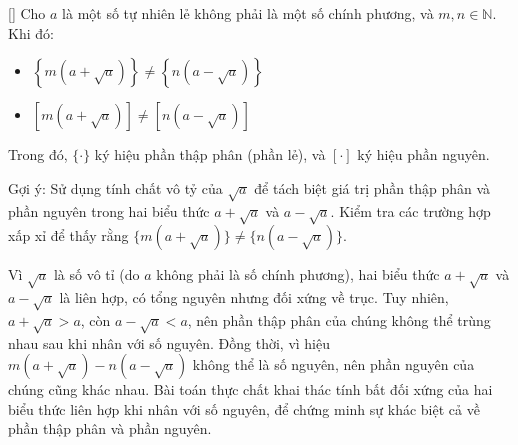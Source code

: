 \documentclass[../02-modular-arithmetic-b.tex]{subfiles}
\begin{document}
\begin{exercise*}\label{example:ROU-2014-MO-G9-P2}[\textbf{}]
    Cho \( a \) là một số tự nhiên lẻ không phải là một số chính phương, và \( m, n \in \mathbb{N} \). Khi đó:

    \begin{itemize}[topsep=0pt, partopsep=0pt, itemsep=0pt]
        \item \( \left\{ m\left( a+\sqrt{a} \right) \right\} \neq \left\{ n\left( a-\sqrt{a} \right) \right\} \)
        \item \( \left[ m\left( a+\sqrt{a} \right) \right] \neq \left[ n\left( a-\sqrt{a} \right) \right] \)
    \end{itemize}

    Trong đó, \( \{\cdot\} \) ký hiệu phần thập phân (phần lẻ), và \( [\cdot] \) ký hiệu phần nguyên.
\end{exercise*}

\begin{remark*}
    Gợi ý: Sử dụng tính chất vô tỷ của \( \sqrt{a} \) để tách biệt giá trị phần thập phân và phần nguyên trong hai biểu thức \( a+\sqrt{a} \) và \( a-\sqrt{a} \).  
    Kiểm tra các trường hợp xấp xỉ để thấy rằng \( \{m(a+\sqrt{a})\} \neq \{n(a-\sqrt{a})\} \).
\end{remark*}

\begin{story*}
    Vì \( \sqrt{a} \) là số vô tỉ (do \( a \) không phải là số chính phương), hai biểu thức \( a+\sqrt{a} \) và \( a-\sqrt{a} \) là liên hợp, có tổng nguyên nhưng đối xứng về trục.  
    Tuy nhiên, \( a+\sqrt{a} > a \), còn \( a-\sqrt{a} < a \), nên phần thập phân của chúng không thể trùng nhau sau khi nhân với số nguyên.  
    Đồng thời, vì hiệu \( m(a+\sqrt{a}) - n(a-\sqrt{a}) \) không thể là số nguyên, nên phần nguyên của chúng cũng khác nhau.  
    Bài toán thực chất khai thác tính bất đối xứng của hai biểu thức liên hợp khi nhân với số nguyên, để chứng minh sự khác biệt cả về phần thập phân và phần nguyên.
\end{story*}
\end{document}
